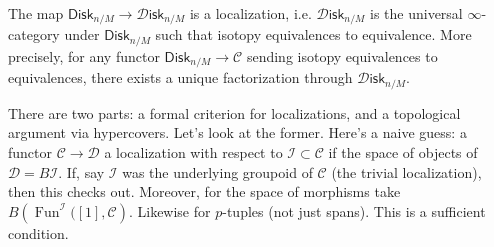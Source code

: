 \documentclass{amsart}
\DeclareMathOperator{\Fun}{Fun}
\begin{document}
\begin{proposition}[AF 2.19]
    The map $\mathsf{Disk}_{n/M}\to \mathcal{D}\mathsf{isk}_{n/M}$ is a localization,
    i.e. $\mathcal{D}\mathsf{isk}_{n/M}$ is the universal $\infty$-category under $\mathsf{Disk}_{n/M}$ such that
    isotopy equivalences to equivalence. More precisely, for any functor $\mathsf{Disk}_{n/M}\to \mathcal{C}$
    sending isotopy equivalences to equivalences, there exists a unique factorization
    through $\mathcal{D}\mathsf{isk}_{n/M}$.
\end{proposition}
There are two parts: a formal criterion for localizations, and a topological argument via
hypercovers. Let's look at the former. Here's a naive guess: a functor $\mathcal{C}\to \mathcal{D}$ a localization with
respect to $\mathcal{I}\subset \mathcal{C}$ if the space of objects of $\mathcal{D}=B\mathcal{I}$.
If, say $\mathcal{I}$ was the underlying groupoid of $\mathcal{C}$ (the trivial localization),
then this checks out. Moreover, for the space of morphisms take $B\left( \Fun^\mathcal{I}([1],\mathcal{C} \right)$.
Likewise for $p$-tuples (not just spans). This is a sufficient condition. 
\end{document}
